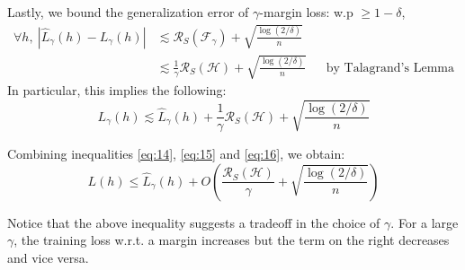 \documentclass[11pt]{article}
\begin{document}
Lastly, we bound the generalization error of $\gamma$-margin loss: w.p $\ge 1-\delta$,
\begin{align*}
    \forall h,~
    \left|
    \hat{L}_\gamma(h) - L_\gamma(h)
    \right|
    &\lesssim \mathcal{R}_S(\mathcal{F}_\gamma) + \sqrt{\frac{\log (2/\delta)}{n}} \\
    &\lesssim \frac{1}{\gamma}
    \mathcal{R}_S(\mathcal{H}) + \sqrt{\frac{\log (2/\delta)}{n}} && \text{by Talagrand's Lemma}
\end{align*}
In particular, this implies the following:
\begin{equation} \label{eq:16}
L_\gamma(h) \lesssim \hat{L}_\gamma(h)
+ \frac{1}{\gamma} \mathcal{R}_S(\mathcal{H})
+ \sqrt{\frac{\log (2/\delta)}{n}}
\end{equation}

Combining inequalities \eqref{eq:14}, \eqref{eq:15} and \eqref{eq:16}, we obtain:
\begin{equation}
L(h) \le \hat{L}_\gamma(h)
+ O\left(\frac{\mathcal{R}_S(\mathcal{H})}{\gamma} + \sqrt{\frac{\log (2/\delta)}{n}}\right)
\end{equation}

Notice that the above inequality suggests a tradeoff in the choice of $\gamma$. For a large $\gamma$, the training loss w.r.t. a margin increases but the term on the right decreases and vice versa.

\end{document}
